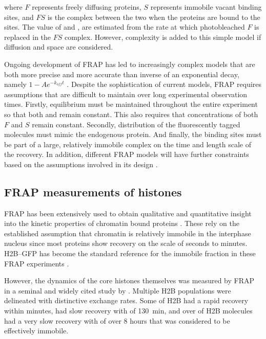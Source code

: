     where $F$ represents freely diffusing proteins,
    $S$ represents immobile vacant binding sites,
    and $FS$ is the complex between the two when the
    proteins are bound to the sites.
    The value of \kon{} and \koff{},
    are estimated from the rate at which photobleached $F$
    is replaced in the $FS$ complex.
    However, complexity is added to this simple model if
    diffusion and space are considered.

    Ongoing development of FRAP has led to increasingly complex models
    that are both more precise and more accurate than
    inverse of an exponential decay, namely $1 - Ae^{-k_{off}t}$
    \citep{mcnally-frap-2010}.
    Despite the sophistication of current models, FRAP requires assumptions
    that are difficult to maintain over long experimental observation times.
    Firstly, equilibrium must be maintained throughout the entire experiment
    so that both \kon{} and \koff{} remain constant.
    This also requires that concentrations of both $F$ and $S$ remain constant.
    Secondly, distribution of the fluorescently tagged molecules
    must mimic the endogenous protein.
    And finally, the binding sites must be part of a large,
    relatively immobile complex
    on the time and length scale of the recovery.
    In addition, different FRAP models will have further constraints
    based on the assumptions involved in its design \citep{mcnally-frap-2010}.

  \subsection{FRAP measurements of histones}

    FRAP has been extensively used to obtain qualitative and
    quantitative insight into the kinetic properties of chromatin bound
    proteins \citep{phair2000high, essers2005nuclear, agresti2005gr}.
    These rely on the established assumption that chromatin is
    relatively immobile in the interphase nucleus
    \citep{abney1997chromatin} since most proteins show recovery
    on the scale of seconds to minutes.
    H2B--GFP \citep{KevinH2BGFP} has become
    the standard reference for the immobile fraction in these
    FRAP experiments \citep{dey2000bromodomain, kuipers2011highly,
    jullien2016chromatibody}.

    However, the dynamics of the core histones themselves
    was measured by FRAP in a seminal
    and widely cited study by \citet{KimuraCook}. Multiple H2B
    populations were delineated with distinctive exchange rates.  Some
     of H2B had a rapid recovery within minutes, 
    had slow recovery with \halflife[] of \SI{130}{\minute},
    and over  of H2B molecules had a
    very slow recovery with \halflife[] of
    over 8 hours that was considered to be effectively immobile.

